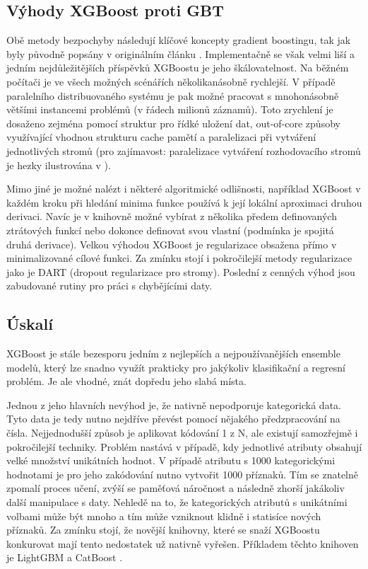 \documentclass[a4paper]{article}
\begin{document}
\subsection{Výhody XGBoost proti GBT}
Obě metody bezpochyby následují klíčové koncepty gradient boostingu, tak jak byly původně popsány v originálním článku \cite{friedman2001greedy}. Implementačně se však velmi liší a jedním nejdůležitějších příspěvků XGBoostu je jeho škálovatelnost. Na běžném počítači je ve všech možných scénářích několikanásobně rychlejší. V případě paralelního distribuovaného systému je pak možné pracovat s mnohonásobně většími instancemi problémů (v řádech milionů záznamů). Toto zrychlení je dosaženo zejména pomocí struktur pro řídké uložení dat, out-of-core způsoby využívající vhodnou strukturu cache pamětí a paralelizaci při vytváření jednotlivých stromů (pro zajímavost: paralelizace vytváření rozhodovacího stromů je hezky ilustrována v \cite{zhanpengfang}). 

Mimo jiné je možné nalézt i některé algoritmické odlišnosti, například XGBoost v každém kroku při hledání minima funkce používá k její lokální aproximaci druhou derivaci. Navíc je v knihovně možné vybírat z několika předem definovaných ztrátových funkcí nebo dokonce definovat svou vlastní (podmínka je spojitá druhá derivace). Velkou výhodou XGBoost je regularizace obsažena přímo v minimalizované cílové funkci. Za zmínku stojí i pokročilejší metody regularizace jako je DART \cite{DBLP:journals/corr/RashmiG15} (dropout regularizace pro stromy). Poslední z cenných výhod jsou zabudované rutiny pro práci s chybějícími daty.

\subsection{Úskalí}
XGBoost je stále bezesporu jedním z nejlepších a nejpoužívanějších ensemble modelů, který lze snadno využít prakticky pro jakýkoliv klasifikační a regresní problém. Je ale vhodné, znát dopředu jeho slabá místa. 

Jednou z jeho hlavních nevýhod je, že nativně nepodporuje kategorická data. Tyto data je tedy nutno nejdříve převést pomocí nějakého předzpracování na čísla. Nejjednodušší způsob je aplikovat kódování 1 z N, ale existují samozřejmě i pokročilejší techniky. Problém nastává v případě, kdy jednotlivé atributy obsahují velké množství unikátních hodnot. V případě atributu s 1000 kategorickými hodnotami je pro jeho zakódování nutno vytvořit 1000 příznaků. Tím se znatelně zpomalí proces učení, zvýší se paměťová náročnost a následně zhorší jakákoliv další manipulace s daty. Nehledě na to, že kategorických atributů s unikátními volbami může být mnoho a tím může vzniknout klidně i statisíce nových příznaků. Za zmínku stojí, že novější knihovny, které se snaží XGBoostu konkurovat mají tento nedostatek už nativně vyřešen. Příkladem těchto knihoven je LightGBM \cite{NIPS2017_6907} a CatBoost \cite{DBLP:journals/corr/DorogushGGKPV17}.
\end{document}
